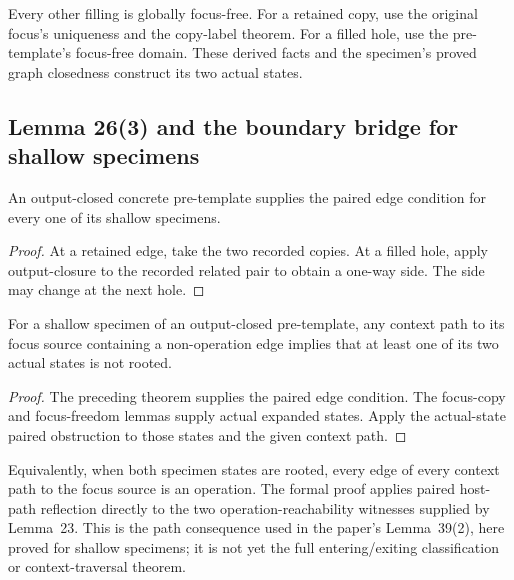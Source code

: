 Every other filling is globally focus-free. For a retained copy, use the
original focus's uniqueness and the copy-label theorem. For a filled hole,
use the pre-template's focus-free domain. These derived facts and the
specimen's proved graph closedness construct its two actual states.

\subsection{Lemma 26(3) and the boundary bridge for shallow specimens}
\begin{theorem}
An output-closed concrete pre-template supplies the paired edge condition
for every one of its shallow specimens.
\end{theorem}
\begin{proof}
At a retained edge, take the two recorded copies. At a filled hole, apply
output-closure to the recorded related pair to obtain a one-way side.
The side may change at the next hole.
\end{proof}

\begin{theorem}
For a shallow specimen of an output-closed pre-template, any context path
to its focus source containing a non-operation edge implies that at least
one of its two actual states is not rooted.
\end{theorem}
\begin{proof}
The preceding theorem supplies the paired edge condition. The focus-copy
and focus-freedom lemmas supply actual expanded states. Apply the actual-state
paired obstruction to those states and the given context path.
\end{proof}

Equivalently, when both specimen states are rooted, every edge of every
context path to the focus source is an operation. The formal proof applies
paired host-path reflection directly to the two operation-reachability
witnesses supplied by Lemma~23. This is the path consequence used in the
paper's Lemma~39(2), here proved for shallow specimens; it is not yet the full
entering/exiting classification or context-traversal theorem.


